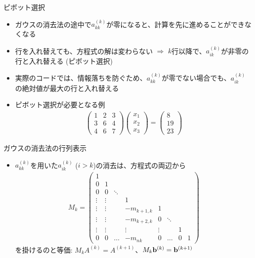 \documentclass[dvipdfmx]{beamer}
\begin{document}
\begin{frame}[t,fragile]{ピボット選択}
  \begin{itemize}
    \setlength{\itemsep}{1em}
  \item ガウスの消去法の途中で$a_{kk}^{(k)}$が零になると、計算を先に進めることができなくなる
  \item 行を入れ替えても、方程式の解は変わらない $\Rightarrow$ $k$行以降で、$a_{ik}^{(k)}$が非零の行と入れ替える (ピボット選択)
  \item 実際のコードでは、情報落ちを防ぐため、$a_{kk}^{(k)}$が零でない場合でも、$a_{ik}^{(k)}$の絶対値が最大の行と入れ替える
  \item ピボット選択が必要となる例
    \begin{align*}
      \begin{pmatrix} 1 & 2 & 3 \\ 3 & 6 & 4 \\ 4 & 6 & 7 \end{pmatrix} \begin{pmatrix} x_1 \\ x_2 \\ x_3 \end{pmatrix} = \begin{pmatrix} 8 \\ 19 \\ 23 \end{pmatrix}
    \end{align*}
  \end{itemize}
\end{frame}

\begin{frame}[t,fragile]{ガウスの消去法の行列表示}
  \begin{itemize}
    \setlength{\itemsep}{1em}
  \item $a_{kk}^{(k)}$を用いた$a_{ik}^{(k)}$ ($i>k$)の消去は、方程式の両辺から
    \begin{align*}
      M_k = 
      \begin{pmatrix}
        1 & \\
        0 & 1 \\
        0 & 0 & \ddots \\
        \vdots & \vdots & & 1 \\
        \vdots & \vdots & & -m_{k+1,k} & 1 & \\
        \vdots & \vdots & & -m_{k+2,k} & 0 & \ddots \\
        \vdots & \vdots & & \vdots & \vdots & & 1 & \\
        0 & 0 & \hdots & -m_{nk} & 0 & \hdots & 0 & 1
      \end{pmatrix}
    \end{align*}
    を掛けるのと等価: $M_k A^{(k)} = A^{(k+1)}$、$M_k {\bf b}^{(k)} = {\bf b}^{(k+1)}$
  \end{itemize}
\end{frame}
\end{document}
